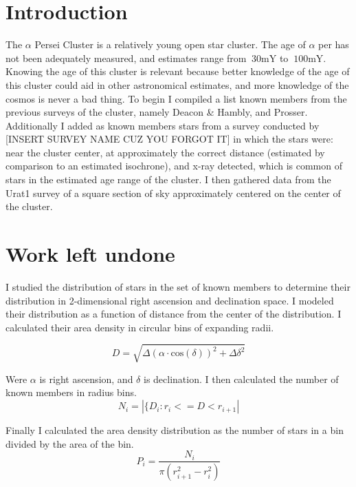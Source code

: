 \documentclass{article}
\begin{document}
\begin{multicols}{2}
\section{Introduction}
The $\alpha$ Persei Cluster is a relatively young open star cluster.  The age of $\alpha$ per has not been adequately measured, and estimates range from $~30\mathrm{mY}$ to $~100\mathrm{mY}$.  Knowing the age of this cluster is relevant because better knowledge of the age of this cluster could aid in other astronomical estimates, and more knowledge of the cosmos is never a bad thing.  To begin I compiled a list known members from the previous surveys of the cluster, namely Deacon \& Hambly, and Prosser.  Additionally I added as known members stars from a survey conducted by [INSERT SURVEY NAME CUZ YOU FORGOT IT] in which the stars were: near the cluster center, at approximately the correct distance (estimated by comparison to an estimated isochrone), and x-ray detected, which is common of stars in the estimated age range of the cluster.  I then gathered data from the Urat1 survey of a square section of sky approximately centered on the center of the cluster.  

\section{Work left undone}
I studied the distribution of stars in the set of known members to determine their distribution in 2-dimensional right ascension and declination space.  I modeled their distribution as a function of distance from the center of the distribution.  I calculated their area density in circular bins of expanding radii.

\begin{equation}
    D=\sqrt{\Delta\left( \alpha\cdot\mathrm{cos}(\delta)\right)^2+\Delta\delta^2}
\end{equation}

Were $\alpha$ is right ascension, and $\delta$ is declination.  I then calculated the number of known members in radius bins.  
\begin{equation}
    N_i=|\{D_i:r_i<=D<r_{i+1}|
\end{equation}

Finally I calculated the area density distribution as the number of stars in a bin divided by the area of the bin.
\begin{equation}
    P_i=\frac{N_i}{\pi(r_{i+1}^2-r_i^2)}
\end{equation}


\end{multicols}
\end{document}
